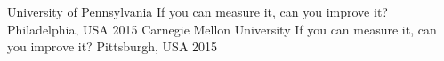 
\begin{cvhonors}
  \cvhonor
    {University of Pennsylvania}
    {If you can measure it, can you improve it?}
    {Philadelphia, USA}
    {2015}
  \cvhonor
   {Carnegie Mellon University}
   {If you can measure it, can you improve it?}
   {Pittsburgh, USA}
   {2015}
 \end{cvhonors}
